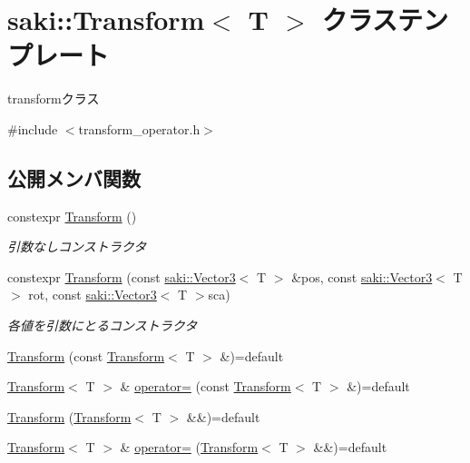 \hypertarget{classsaki_1_1_transform}{}\section{saki\+:\+:Transform$<$ T $>$ クラステンプレート}
\label{classsaki_1_1_transform}


transformクラス  




{\ttfamily \#include $<$transform\+\_\+operator.\+h$>$}

\subsection*{公開メンバ関数}
\begin{DoxyCompactItemize}
\item 
constexpr \mbox{\hyperlink{classsaki_1_1_transform_abdd7b5f310bccc56b804a2cf21890a35}{Transform}} ()
\begin{DoxyCompactList}\small\item\em 引数なしコンストラクタ \end{DoxyCompactList}\item 
constexpr \mbox{\hyperlink{classsaki_1_1_transform_a63e2a4e0fe65040566c13897255af67e}{Transform}} (const \mbox{\hyperlink{classsaki_1_1_vector3}{saki\+::\+Vector3}}$<$ T $>$ \&pos, const \mbox{\hyperlink{classsaki_1_1_vector3}{saki\+::\+Vector3}}$<$ T $>$ rot, const \mbox{\hyperlink{classsaki_1_1_vector3}{saki\+::\+Vector3}}$<$ T $>$sca)
\begin{DoxyCompactList}\small\item\em 各値を引数にとるコンストラクタ \end{DoxyCompactList}\item 
\mbox{\hyperlink{classsaki_1_1_transform_a86e4e6b8c8a3387f5659e71b377a9995}{Transform}} (const \mbox{\hyperlink{classsaki_1_1_transform}{Transform}}$<$ T $>$ \&)=default
\item 
\mbox{\hyperlink{classsaki_1_1_transform}{Transform}}$<$ T $>$ \& \mbox{\hyperlink{classsaki_1_1_transform_acfdf423e01196edf631f272400645cfa}{operator=}} (const \mbox{\hyperlink{classsaki_1_1_transform}{Transform}}$<$ T $>$ \&)=default
\item 
\mbox{\hyperlink{classsaki_1_1_transform_a065323d290c8c4edd76855e7b9634ab8}{Transform}} (\mbox{\hyperlink{classsaki_1_1_transform}{Transform}}$<$ T $>$ \&\&)=default
\item 
\mbox{\hyperlink{classsaki_1_1_transform}{Transform}}$<$ T $>$ \& \mbox{\hyperlink{classsaki_1_1_transform_a66ea10234a845d96e63bbb9c2a1050eb}{operator=}} (\mbox{\hyperlink{classsaki_1_1_transform}{Transform}}$<$ T $>$ \&\&)=default

\end{DoxyCompactItemize}
